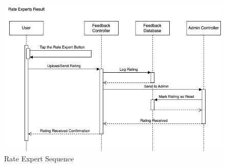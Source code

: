 \begin{figure}[H]
	\centering
	\includegraphics[width=\textwidth, height=\textheight, keepaspectratio]{Section3/images/RateExpertsResultSequenceDiagram.drawio.png}
	\caption{Rate Expert Sequence}
	\label{RateExpertSequence}
\end{figure}